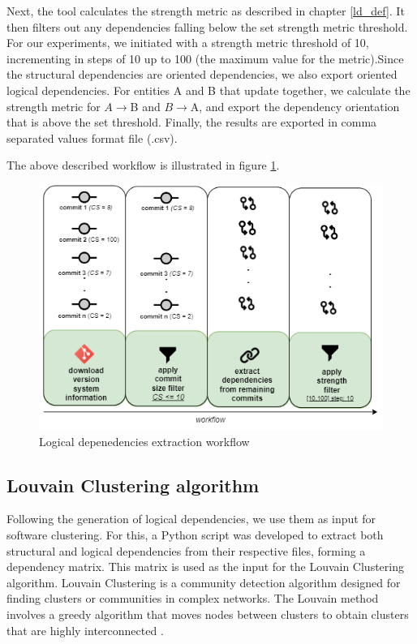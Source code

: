 \documentclass[conference]{IEEEtran}
\begin{document}
Next, the tool calculates the strength metric as described in chapter \ref{ld_def}. It then filters out any dependencies falling below the set strength metric threshold. For our experiments, we initiated with a strength metric threshold of 10, incrementing in steps of 10 up to 100 (the maximum value for the metric).Since the structural dependencies are oriented dependencies, we also export oriented logical dependencies. For entities A and B that update together, we calculate the strength metric for $A \rightarrow $B and $B \rightarrow $A, and export the dependency orientation that is above the set threshold. Finally, the results are exported in comma separated values format file (.csv). 

The above described workflow is illustrated in figure \ref{fig:extraction}.


\begin{figure}
\centering
\includegraphics[width=\columnwidth]{dependencies-export.png}
\caption{Logical depenedencies extraction workflow}
\label{fig:extraction}
\centering
\end{figure}

\subsection{Louvain Clustering algorithm}

Following the generation of logical dependencies, we use them as input for software clustering. For this, a Python script was developed to extract both structural and logical dependencies from their respective files, forming a dependency matrix. This matrix is used as the input for the Louvain Clustering algorithm. 
Louvain Clustering is a community detection algorithm designed for finding clusters or communities in complex networks. The Louvain method involves a greedy algorithm that moves nodes between clusters to obtain clusters that are highly interconnected \cite{louvain_clustering}.
\end{document}
